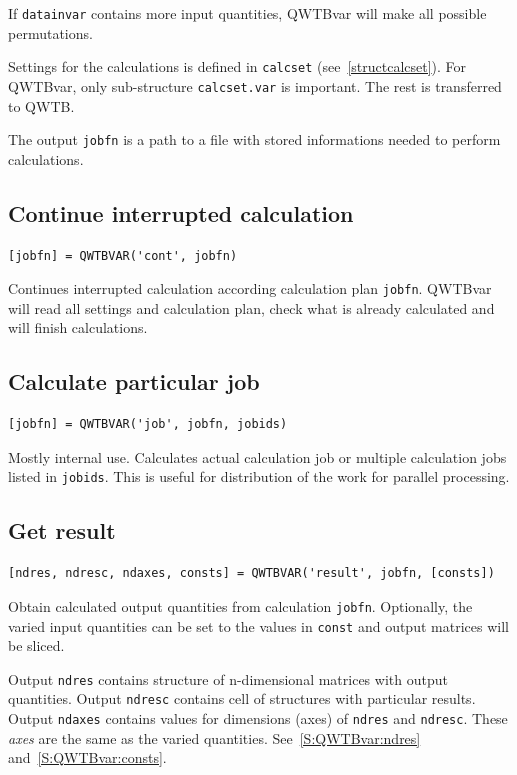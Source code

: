 \documentclass[12pt,a4paper,oneside]{report} %
\newcommand{\li}[1]{\lstinline{#1}}     %
\begin{document}
If \li{datainvar} contains more input quantities, QWTBvar will make all
possible permutations.

Settings for the calculations is defined in \li{calcset}
(see~\ref{structcalcset}). For QWTBvar, only sub-structure \li{calcset.var} is
important. The rest is transferred to QWTB.

The output \li{jobfn} is a path to a file with stored informations
needed to perform calculations.

\subsection{Continue interrupted calculation}
\label{S:QWTBvar:cont}
\begin{lstlisting}
[jobfn] = QWTBVAR('cont', jobfn)
\end{lstlisting}
Continues interrupted calculation according calculation plan \li{jobfn}.
QWTBvar will read all settings and calculation plan, check what is already
calculated and will finish calculations.

\subsection{Calculate particular job}
\label{S:QWTBvar:job}
\begin{lstlisting}
[jobfn] = QWTBVAR('job', jobfn, jobids)
\end{lstlisting}
Mostly internal use. Calculates actual calculation job or multiple calculation
jobs listed in \li{jobids}. This is useful for distribution of the work for
parallel processing.

\subsection{Get result}
\label{S:QWTBvar:result}
\begin{lstlisting}
[ndres, ndresc, ndaxes, consts] = QWTBVAR('result', jobfn, [consts])
\end{lstlisting}
Obtain calculated output quantities from calculation \li{jobfn}.
Optionally, the varied input quantities can be set to the values in
\li{const} and output matrices will be sliced.

Output \li{ndres} contains structure of n-dimensional matrices with
output quantities. Output \li{ndresc} contains cell of structures with particular results.
Output \li{ndaxes} contains values for dimensions (axes) of
\li{ndres} and \li{ndresc}. These \emph{axes} are the same as the
varied quantities. See~\ref{S:QWTBvar:ndres} and~\ref{S:QWTBvar:consts}.
\end{document}
